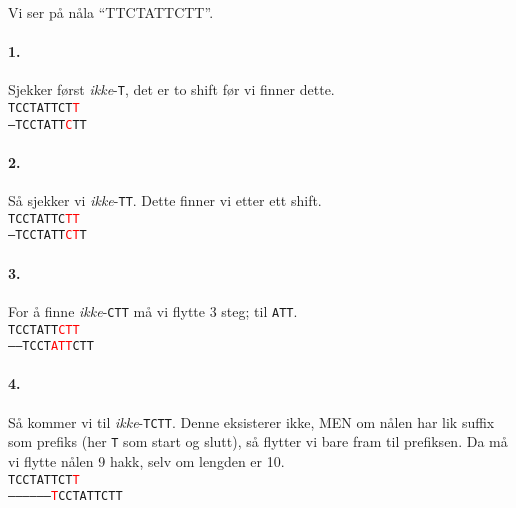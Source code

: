 		\begin{eks}
		Vi ser på nåla ``TTCTATTCTT''.

\paragraph{1.} Sjekker først \textit{ikke}-\texttt{T}, det er to shift før vi finner dette.
\\
\noindent\texttt{TCCTATTCT\textcolor{red}{T}}\\
\texttt{---TCCTATT\textcolor{red}{C}TT}

\paragraph{2.} Så sjekker vi \textit{ikke}-\texttt{TT}. Dette finner vi etter ett shift.
\\
\noindent\texttt{TCCTATTC\textcolor{red}{TT}}\\
\texttt{--TCCTATT\textcolor{red}{CT}T}

\paragraph{3.} For å finne \textit{ikke}-\texttt{CTT} må vi flytte 3 steg; til \texttt{ATT}.
\\
\noindent\texttt{TCCTATT\textcolor{red}{CTT}}\\
\texttt{------TCCT\textcolor{red}{ATT}CTT}

\paragraph{4.} Så kommer vi til \textit{ikke}-\texttt{TCTT}. Denne eksisterer ikke, MEN om nålen har lik suffix som prefiks (her \texttt{T} som start og slutt), så flytter vi bare fram til prefiksen. Da må vi flytte nålen 9 hakk, selv om lengden er 10.
\\
\noindent\texttt{TCCTATTCT\textcolor{red}{T}}\\
\texttt{------------------\textcolor{red}{T}CCTATTCTT}


\end{eks}
